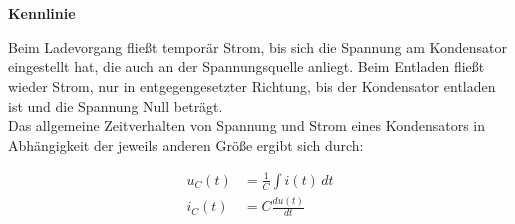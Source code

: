 \documentclass{article}
\begin{document}
\begin{mdframed}
\centering
\vspace{0.2\baselineskip}
\\
\vspace{0.5\baselineskip}
\raisebox{-0.5\height}{}\\
\vspace{1\baselineskip}
\begin{mdframed}[linewidth=0.4mm]
\flushleft\textbf{\large Kennlinie}\\
\centering
\raisebox{-0.5\height}{} 
\begin{minipage}{0.4\textwidth}
Beim Ladevorgang fließt temporär Strom, bis sich die Spannung am Kondensator eingestellt hat, die auch an der Spannungsquelle anliegt. Beim Entladen fließt wieder Strom, nur in entgegengesetzter Richtung, bis der Kondensator entladen ist und die Spannung Null beträgt.\\ Das allgemeine Zeitverhalten von Spannung und Strom eines Kondensators in Abhängigkeit der jeweils anderen Größe ergibt sich durch:\\ \begin{mdframed}[linewidth=0.7mm]
\vspace{-0.8\baselineskip}
\begin{align*}
u_C(t) &= \frac{1}{C} \int i(t)\,dt \\
i_C(t) &= C \frac{du(t)}{dt}
\end{align*}
\end{mdframed}
\vspace{0.4\baselineskip}
\end{minipage}
\end{mdframed}
\vspace{0.5\baselineskip}
\end{mdframed}

\flushleft
\end{document}
